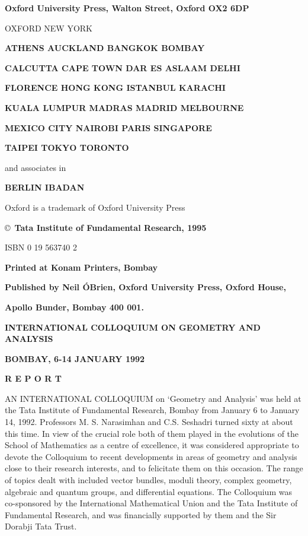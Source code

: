 \begin{center}
{\bf Oxford University Press, Walton Street, Oxford OX2 6DP}
\medskip

\textsc{OXFORD NEW YORK}

\textbf{ATHENS AUCKLAND BANGKOK BOMBAY}

\textbf{CALCUTTA CAPE TOWN DAR ES ASLAAM DELHI}

\textbf{FLORENCE HONG KONG ISTANBUL KARACHI}

\textbf{KUALA LUMPUR MADRAS MADRID MELBOURNE}

\textbf{MEXICO CITY NAIROBI PARIS SINGAPORE}

\textbf{TAIPEI TOKYO TORONTO}

and associates in

\textbf{BERLIN IBADAN}

Oxford is a trademark of Oxford University Press

\vskip 4cm

\copyright\ \textbf{Tata Institute of Fundamental Research, 1995}

ISBN 0 19 563740 2
\vfill

\textbf{Printed at Konam Printers, Bombay}

\textbf{Published by Neil \'OBrien, Oxford University Press, Oxford House,}

\textbf{Apollo Bunder, Bombay 400 001.}

\medskip

\end{center}

\eject

\begin{center}
{\bf INTERNATIONAL COLLOQUIUM ON GEOMETRY AND ANALYSIS}
\medskip

{\bf BOMBAY, 6-14 JANUARY 1992}

\medskip

{\bf R E P O R T}

\end{center}

AN INTERNATIONAL COLLOQUIUM  on `Geometry and Analysis' was held at the Tata Institute of Fundamental Research, Bombay from January 6 to January 14, 1992. Professors M. S. Narasimhan and C.S. Seshadri turned sixty at about this time. In view of the crucial role both of them played in the evolutions of the School of Mathematics as a centre of excellence, it was considered appropriate to devote the Colloquium to recent developments in areas of geometry and analysis close to their research interests, and to felicitate them on this occasion. The range of topics dealt with included vector bundles, moduli theory, complex geometry, algebraic and quantum groups, and differential equations. The Colloquium was co-sponsored by the International Mathematical Union and the Tata Institute of Fundamental Research, and was financially supported by them and the Sir Dorabji Tata Trust.

